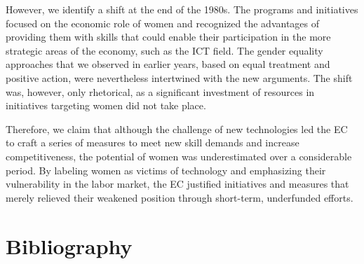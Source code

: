 \documentclass{tufte-handout}
\begin{document}
However, we identify a shift at the end of the 1980s. The programs and
initiatives focused on the economic role of women and recognized the
advantages of providing them with skills that could enable their
participation in the more strategic areas of the economy, such as the
ICT field. The gender equality approaches that we observed in earlier
years, based on equal treatment and positive action, were nevertheless
intertwined with the new arguments. The shift was, however, only
rhetorical, as a significant investment of resources in initiatives
targeting women did not take place.

Therefore, we claim that although the challenge of new technologies led
the EC to craft a series of measures to meet new skill demands and
increase competitiveness, the potential of women was underestimated over
a considerable period. By labeling women as victims of technology and
emphasizing their vulnerability in the labor market, the EC justified
initiatives and measures that merely relieved their weakened position
through short-term, underfunded efforts.


\section{Bibliography}\label{bibliography}
\end{document}

